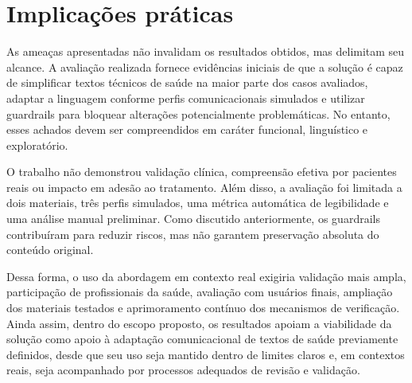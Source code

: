 \section{Implicações práticas}
\label{sec:sintese-limitacoes}

As ameaças apresentadas não invalidam os resultados obtidos, mas delimitam seu alcance. A avaliação realizada fornece evidências iniciais de que a solução é capaz de simplificar textos técnicos de saúde na maior parte dos casos avaliados, adaptar a linguagem conforme perfis comunicacionais simulados e utilizar guardrails para bloquear alterações potencialmente problemáticas. No entanto, esses achados devem ser compreendidos em caráter funcional, linguístico e exploratório.

O trabalho não demonstrou validação clínica, compreensão efetiva por pacientes reais ou impacto em adesão ao tratamento. Além disso, a avaliação foi limitada a dois materiais, três perfis simulados, uma métrica automática de legibilidade e uma análise manual preliminar. Como discutido anteriormente, os guardrails contribuíram para reduzir riscos, mas não garantem preservação absoluta do conteúdo original.

Dessa forma, o uso da abordagem em contexto real exigiria validação mais ampla, participação de profissionais da saúde, avaliação com usuários finais, ampliação dos materiais testados e aprimoramento contínuo dos mecanismos de verificação. Ainda assim, dentro do escopo proposto, os resultados apoiam a viabilidade da solução como apoio à adaptação comunicacional de textos de saúde previamente definidos, desde que seu uso seja mantido dentro de limites claros e, em contextos reais, seja acompanhado por processos adequados de revisão e validação.